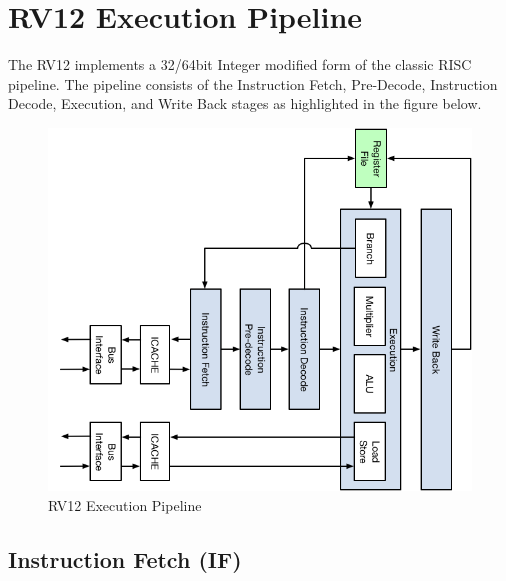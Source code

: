 \chapter{RV12 Execution Pipeline}

The RV12 implements a 32/64bit Integer modified form of the classic RISC pipeline. The pipeline consists of the Instruction Fetch, Pre-Decode, Instruction Decode, Execution, and Write Back stages as highlighted in the figure below.
 

\begin{figure}[h]
  \includegraphics{assets/img/Pipeline-Overview.png}
  \caption{RV12 Execution Pipeline}
\end{figure}

\pagebreak

\section{Instruction Fetch (IF)}\label{instruction-fetch-if}

